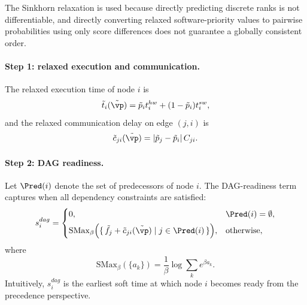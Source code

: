 The Sinkhorn relaxation is used because directly predicting discrete ranks is not differentiable, and directly converting relaxed software-priority values to pairwise probabilities using only score differences does not guarantee a globally consistent order.

\paragraph{\textbf{Step 1: relaxed execution and communication.}}
The relaxed execution time of node $i$ is
\begin{equation}
\tilde{t}_i(\tilde{\vp})=\tilde{p}_i t_i^{hw} + (1-\tilde{p}_i)t_i^{sw},
\end{equation}
and the relaxed communication delay on edge $(j,i)$ is
\begin{equation}
\tilde{c}_{ji}(\tilde{\vp})=|\tilde{p}_j-\tilde{p}_i|\,C_{ji}.
\end{equation}

\paragraph{\textbf{Step 2: DAG readiness.}}
Let $\Pred(i)$ denote the set of predecessors of node $i$. The DAG-readiness term captures when all dependency constraints are satisfied:
\begin{equation}
s_i^{dag}
=
\begin{cases}
0, & \Pred(i)=\emptyset,\\[4pt]
\mathrm{SMax}_{\beta}
\Big(
\{\, \tilde{f}_j + \tilde{c}_{ji}(\tilde{\vp}) \mid j \in \Pred(i)\,\}
\Big), & \text{otherwise},
\end{cases}
\end{equation}
where
\begin{equation}
\mathrm{SMax}_{\beta}(\{a_k\}) = \frac{1}{\beta}\log\sum_k e^{\beta a_k}.
\end{equation}
Intuitively, $s_i^{dag}$ is the earliest soft time at which node $i$ becomes ready from the precedence perspective.

